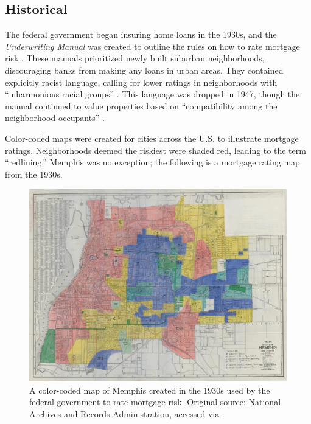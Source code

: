 \documentclass[
]{book}
\begin{document}
\hypertarget{historical}{%
\subsection{Historical}\label{historical}}

The federal government began insuring home loans in the 1930s, and the \emph{Underwriting Manual} was created to outline the rules on how to rate mortgage risk \citep[ 65]{rothstein2017}. These manuals prioritized newly built suburban neighborhoods, discouraging banks from making any loans in urban areas. They contained explicitly racist language, calling for lower ratings in neighborhoods with ``inharmonious racial groups'' \citep[ §§ 935, 937, 951, 982]{federalhousingadministration1938}. This language was dropped in 1947, though the manual continued to value properties based on ``compatibility among the neighborhood occupants'' \citep[ 66, citing the 1952 \emph{Manual}]{rothstein2017}.

Color-coded maps were created for cities across the U.S. to illustrate mortgage ratings. Neighborhoods deemed the riskiest were shaded red, leading to the term ``redlining.'' Memphis was no exception; the following is a mortgage rating map from the 1930s.

\begin{figure}
\centering
\includegraphics{_img/memphis_redliningmap.jpg}
\caption{A color-coded map of Memphis created in the 1930s used by the federal government to rate mortgage risk. Original source: National Archives and Records Administration, accessed via \citep{bradley2019}.}
\end{figure}
\end{document}
